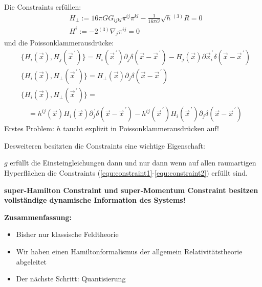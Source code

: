 \documentclass[mathserif]{beamer}
\newcommand{\inHS}{{}^{(3)}\!}
\theoremstyle{definition}
\begin{document}
	\begin{frame}
		Die Constraints erfüllen:
		\begin{align}
			&H_{\perp}:=16\pi G G_{ijkl}\pi^{ij}\pi^{kl}-\frac{1}{16\pi G}\sqrt{h}\inHS R=0 \label{equ:constraint1}\\
			&H^i:=-2\inHS\nabla_j\pi^{ij}=0 \label{equ:constraint2}
		\end{align}
		und die Poissonklammerausdrücke:
		\begin{align*}
			&\{H_i(\vec{x}),H_j(\vec{x}^{\,\prime})\}=H_i(\vec{x}^{\,\prime})\partial_j\delta(\vec{x}-\vec{x}^{\,\prime})-H_j(\vec{x})\partial\vec{x}^{\,\prime}_i\delta(\vec{x}-\vec{x}^{\,\prime})\\
			&\{H_i(\vec{x}),H_\perp(\vec{x}^{\,\prime})\}=H_\perp(\vec{x})\partial_j\delta(\vec{x}-\vec{x}^{\,\prime})\\
			&\{H_i(\vec{x}),H_\perp(\vec{x}^{\,\prime})\}=\\
			&\quad=h^{ij}(\vec{x})H_i(\vec{x})\partial^{\,\prime}_j\delta(\vec{x}-\vec{x}^{\,\prime})-h^{ij}(\vec{x}^{\,\prime})H_i(\vec{x}^{\,\prime})\partial_j\delta(\vec{x}-\vec{x}^{\,\prime})
		\end{align*}
		Erstes Problem: $h$ taucht explizit in Poissonklammerausdrücken auf!
	\end{frame}
	\begin{frame}
		Desweiteren besitzten die Constraints eine wichtige Eigenschaft:
		\begin{theorem}
			$g$ erfüllt die Einsteingleichungen dann und nur dann wenn auf allen raumartigen Hyperflächen
			die Constraints (\ref{equ:constraint1}-\ref{equ:constraint2}) erfüllt sind.
		\end{theorem}
		\pause
		\begin{center}
			\textbf{super-Hamilton Constraint und super-Momentum Constraint besitzen vollständige dynamische Information des Systems!}
		\end{center}
	\end{frame}
	\begin{frame}
		\begin{center}
			\textbf{Zusammenfassung:}
		\end{center}
		\begin{itemize}
			\item Bisher nur klassische Feldtheorie
			\pause
			\item Wir haben einen Hamiltonformalismus der allgemein Relativitätstheorie abgeleitet
			\pause
			\item Der nächste Schritt: Quantisierung
		\end{itemize}
	\end{frame}
\end{document}
